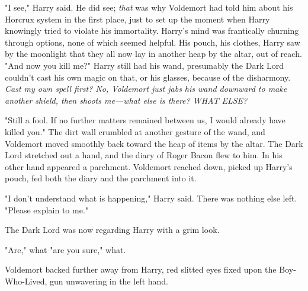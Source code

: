 "I see," Harry said. He did see; \emph{that} was why Voldemort had told him
about his Horcrux system in the first place, just to set up the moment when
Harry knowingly tried to violate his immortality. Harry's mind was frantically
churning through options, none of which seemed helpful. His pouch, his clothes,
Harry saw by the moonlight that they all now lay in another heap by the altar,
out of reach. "And now you kill me?" Harry still had his wand, presumably the
Dark Lord couldn't cast his own magic on that, or his glasses, because of the
disharmony. \emph{Cast my own spell first? No, Voldemort just jabs his wand
downward to make another shield, then shoots me---what else is there? WHAT
ELSE?}

"Still a fool. If no further matters remained between us, I would already have
killed you." The dirt wall crumbled at another gesture of the wand, and
Voldemort moved smoothly back toward the heap of items by the altar. The Dark
Lord stretched out a hand, and the diary of Roger Bacon flew to him.
 In
his other hand appeared a parchment.  Voldemort reached down, picked up Harry's pouch, fed both
the diary and the parchment into it. 

"I don't understand what is happening," Harry said. There was nothing else
left. "Please explain to me."

The Dark Lord was now regarding Harry with a grim look. 

"Are," what "are you sure," what.

 Voldemort backed further away
from Harry, red slitted eyes fixed upon the Boy-Who-Lived, gun unwavering in
the left hand. 

